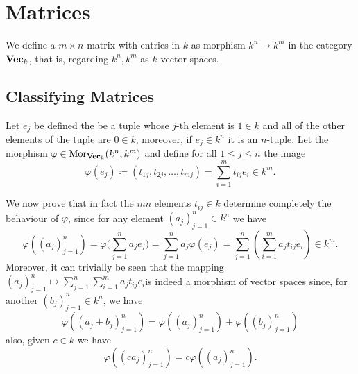 \section{Matrices}

\begin{definition}[Matrix]
   We define a \(m \times n\) matrix with entries in \(k\) as morphism \(k^n \to
   k^m\) in the category \({\textbf{Vec}}_k\), that is, regarding \(k^n, k^m\) as
   \(k\)-vector spaces.
\end{definition}

\subsection{Classifying Matrices}

Let \(e_j\) be defined the be a tuple whose \(j\)-th element is \(1 \in k\) and
all of the other elements of the tuple are \(0 \in k\), moreover, if \(e_j \in
k^n\) it is an \(n\)-tuple. Let the morphism \(\varphi \in \operatorname{Mor}_{{\textbf{Vec}}_k}
(k^n, k^m)\) and define for all \(1 \leq j \leq n\) the image
\[
   \varphi(e_j) \coloneq (t_{1 j}, t_{2 j}, \dots, t_{mj}) = \sum_{i = 1}^m t_{ij} e_i
   \in k^m.
\]

We now prove that in fact the \(mn\) elements \(t_{ij} \in k\) determine
completely the behaviour of \(\varphi\), since for any element \((a_j)_{j=1}^n
\in k^n\) we have
\[
   \varphi((a_j)_{j=1}^n) = \varphi \Bigg( \sum_{j=1}^n a_j e_j \Bigg) =
   \sum_{j=1}^n a_j \varphi(e_j) = \sum_{j=1}^n \left( \sum_{i=1}^m a_j t_{i j}
   e_i\right) \in k^m.
\]
Moreover, it can trivially be seen that the mapping \((a_j)_{j=1}^n \mapsto
\sum_{j=1}^n \sum_{i=1}^m a_j t_{ij} e_i\)is indeed a morphism of vector
spaces since, for another \((b_j)_{j=1}^n \in k^n\), we have
\[
   \varphi((a_j + b_j)_{j=1}^n) = \varphi((a_j)_{j=1}^n) +
   \varphi((b_j)_{j=1}^n)
\]
also, given \(c \in k\) we have
\[
   \varphi((c a_j)_{j=1}^n) = c\varphi((a_j)_{j=1}^n).
\]

